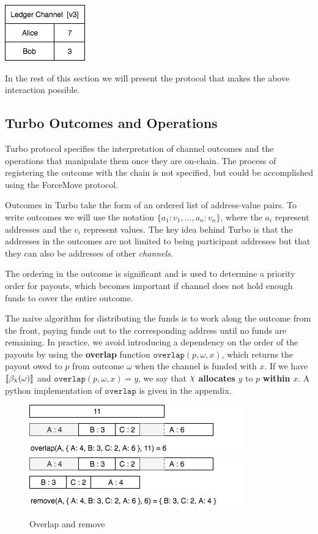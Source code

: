 \documentclass{article}
\DeclareRobustCommand{\rchi}{{\mathpalette\irchi\relax}}
\newcommand{\irchi}[2]{\raisebox{\depth}{$#1\chi$}} %
\theoremstyle{definition}
\newcommand{\adj}[1]{\llbracket #1 \rrbracket}
\begin{document}
\begin{center}
  \includegraphics[scale=0.5]{turbo_finish} %
\end{center}

In the rest of this section we will present the protocol that makes the above interaction
possible.

\subsection{Turbo Outcomes and Operations}

Turbo protocol specifies the interpretation of channel outcomes and the operations that
manipulate them once they are on-chain.
The process of registering the outcome with the chain is not specified, but could be accomplished
using the ForceMove protocol.

Outcomes in Turbo take the form of an ordered list of address-value pairs.
To write outcomes we will use the notation $\{a_1{:}v_1, \dots, a_n{:}v_n \}$, where the $a_i$
represent addresses and the $v_i$ represent values.
The key idea behind Turbo is that the addresses in the outcomes are not limited to being
participant addresses but that they can also be addresses of other \textit{channels}.

The ordering in the outcome is significant and is used to determine a priority order for payouts,
which becomes important if channel does not hold enough funds to cover the entire outcome.

The naive algorithm for distributing the funds is to work along the outcome from the front,
paying funds out to the corresponding address until no funds are remaining.
In practice, we avoid introducing a dependency on the order of the payouts by using
the \textbf{overlap} function $\texttt{overlap}(p, \omega, x)$, which returns the payout owed
to $p$ from outcome $\omega$ when the channel is funded with $x$.
If we have $\adj{\beta_\rchi(\omega)}$ and $\texttt{overlap}(p, \omega, x) = y$, we say that $\rchi$ \textbf{allocates} $y$ to $p$ \textbf{within} $x$.
A python implementation of $\texttt{overlap}$ is given in the appendix.

\begin{figure}[ht]
  \centering
  \includegraphics[scale=0.7]{overlap} %
  \includegraphics[scale=0.7]{remove} %
  \caption{Overlap and remove}
\end{figure}
\end{document}
